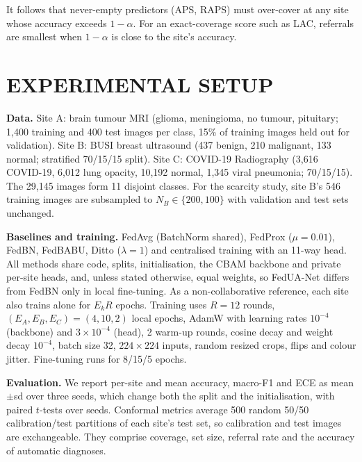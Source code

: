 \documentclass[]{spie}
\begin{document}
\noindent It follows that never-empty predictors (APS, RAPS) must over-cover at any site whose accuracy exceeds $1-\alpha$. For an exact-coverage score such as LAC, referrals are smallest when $1-\alpha$ is close to the site's accuracy.

\section{EXPERIMENTAL SETUP}
\label{sec:exp}

\textbf{Data.} Site A: brain tumour MRI\cite{nickparvar2021brain} (glioma, meningioma, no tumour, pituitary; 1,400 training and 400 test images per class, 15\% of training images held out for validation). Site B: BUSI breast ultrasound\cite{aldhabyani2020dataset} (437 benign, 210 malignant, 133 normal; stratified 70/15/15 split). Site C: COVID-19 Radiography\cite{chowdhury2020ai,rahman2021exploring} (3,616 COVID-19, 6,012 lung opacity, 10,192 normal, 1,345 viral pneumonia; 70/15/15). The 29,145 images form 11 disjoint classes. For the scarcity study, site B's 546 training images are subsampled to $N_B\in\{200,100\}$ with validation and test sets unchanged.

\textbf{Baselines and training.} FedAvg\cite{mcmahan2017communication} (BatchNorm shared), FedProx\cite{litian2020fedprox} ($\mu{=}0.01$), FedBN\cite{lixiaoxiao2021fedbn}, FedBABU\cite{oh2022fedbabu}, Ditto\cite{litian2021ditto} ($\lambda{=}1$) and centralised training with an 11-way head. All methods share code, splits, initialisation, the CBAM backbone and private per-site heads, and, unless stated otherwise, equal weights, so FedUA-Net differs from FedBN only in local fine-tuning. As a non-collaborative reference, each site also trains alone for $E_kR$ epochs. Training uses $R{=}12$ rounds, $(E_A,E_B,E_C)=(4,10,2)$ local epochs, AdamW with learning rates $10^{-4}$ (backbone) and $3{\times}10^{-4}$ (head), 2 warm-up rounds, cosine decay and weight decay $10^{-4}$, batch size 32, $224{\times}224$ inputs, random resized crops, flips and colour jitter. Fine-tuning runs for 8/15/5 epochs.

\textbf{Evaluation.} We report per-site and mean accuracy, macro-F1 and ECE as mean$\pm$sd over three seeds, which change both the split and the initialisation, with paired $t$-tests over seeds. Conformal metrics average 500 random 50/50 calibration/test partitions of each site's test set, so calibration and test images are exchangeable. They comprise coverage, set size, referral rate and the accuracy of automatic diagnoses.
\end{document}
